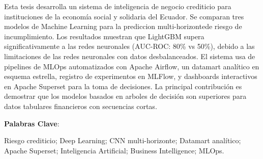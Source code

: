 Esta tesis desarrolla un sistema de inteligencia de negocio crediticio para instituciones de la economía social y solidaria del Ecuador. Se comparan tres modelos de Machine Learning para la prediccion multi-horizontede riesgo de incumplimiento. Los resultados muestran que LightGBM supera significativamente a las redes neuronales (AUC-ROC: 80\% vs 50\%), debido a las limitaciones de las redes neuronales con datos desbalanceados. El sistema usa de pipelines de MLOps automatizados con Apache Airflow, un datamart analítico en esquema estrella, registro de experimentos en MLFlow, y dashboards interactivos en Apache Superset para la toma de decisiones. La principal contribución es demostrar que los modelos basados en arboles de decisión son superiores para datos tabulares financieros con secuencias cortas.


\noindent\textbf{Palabras Clave}:

Riesgo crediticio; Deep Learning; CNN multi-horizonte; Datamart analítico; Apache Superset; Inteligencia Artificial; Business Intelligence; MLOps.
